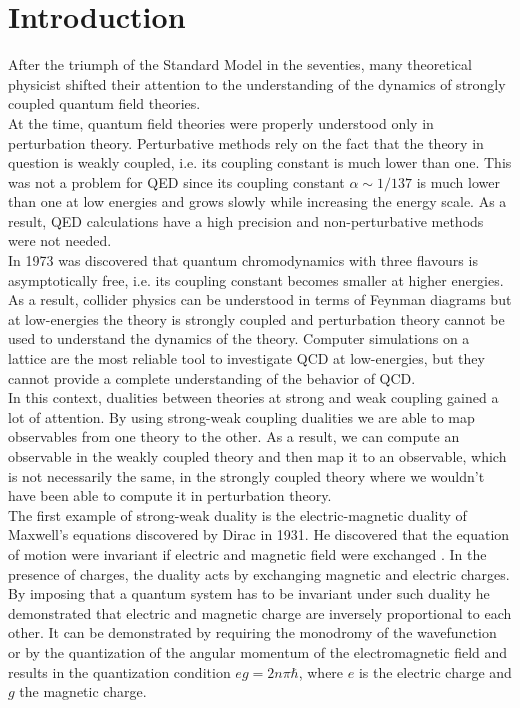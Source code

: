 
\chapter{Introduction}

After the triumph of the Standard Model in the seventies, many theoretical physicist shifted their attention to the understanding of the dynamics of strongly coupled quantum field theories. \\
At the time, quantum field theories were properly understood only in perturbation theory. 
Perturbative methods rely on the fact that the theory in question is weakly coupled, i.e. its coupling constant is much lower than one. This was not a problem for QED since its coupling constant $\alpha \sim 1/137$ is much lower than one at low energies and grows slowly while increasing the energy scale.
As a result, QED calculations have a high precision and non-perturbative methods were not needed.\\
In 1973 was discovered that quantum chromodynamics with three flavours is asymptotically free, i.e. its coupling constant becomes smaller at higher energies. 
As a result, collider physics can be understood in terms of Feynman diagrams but at low-energies the theory is strongly coupled and perturbation theory cannot be used to understand the dynamics of the theory.
Computer simulations on a lattice are the most reliable tool to investigate QCD at low-energies, but they cannot provide a complete understanding of the behavior of QCD.\\ 
In this context, dualities between theories at strong and weak coupling gained a lot of attention. 
By using strong-weak coupling dualities we are able to map observables from one theory to the other.
As a result, we can compute an observable in the weakly coupled theory and then map it to an observable, which is not necessarily the same, in the strongly coupled theory where we wouldn't have been able to compute it in perturbation theory.  \\

The first example of strong-weak duality is the electric-magnetic duality of Maxwell's equations discovered by Dirac in 1931.  
He discovered that the equation of motion were invariant if electric and magnetic field were exchanged . 
In the presence of charges, the duality acts by exchanging magnetic and electric charges. 
By imposing that a quantum system has to be invariant under such duality he demonstrated that electric and magnetic charge are inversely proportional to each other. 
It can be demonstrated by requiring the monodromy of the wavefunction or by the quantization of the angular momentum of the electromagnetic field and results in the quantization condition $e g =  2 n \pi \hbar$, where $e$ is the electric charge and $g$ the magnetic charge.\\

